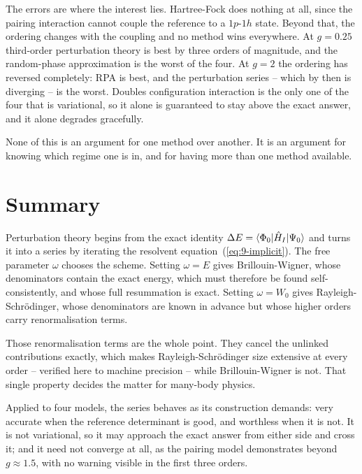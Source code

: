 The errors are where the interest lies.  Hartree-Fock does nothing at all,
since the pairing interaction cannot couple the reference to a $1p$-$1h$
state.  Beyond that, the ordering changes with the coupling and no method
wins everywhere.  At $g=0.25$ third-order perturbation theory is best by
three orders of magnitude, and the random-phase approximation is the worst of
the four.  At $g=2$ the ordering has reversed completely: RPA is best, and
the perturbation series -- which by then is diverging -- is the worst.
Doubles configuration interaction is the only one of the four that is
variational, so it alone is guaranteed to stay above the exact answer, and it
alone degrades gracefully.

None of this is an argument for one method over another.  It is an argument
for knowing which regime one is in, and for having more than one method
available.

\section{Summary}
\label{sec:ch9summary}

Perturbation theory begins from the exact identity
$\Delta E=\langle \Phi_0 | \hat{H}_I | \Psi_0 \rangle$ and turns it into a series by
iterating the resolvent equation~(\ref{eq:9-implicit}).  The free parameter
$\omega$ chooses the scheme.  Setting $\omega=E$ gives Brillouin-Wigner,
whose denominators contain the exact energy, which must therefore be found
self-consistently, and whose full resummation is exact.  Setting $\omega=W_0$
gives Rayleigh-Schr\"odinger, whose denominators are known in advance but
whose higher orders carry renormalisation terms.

Those renormalisation terms are the whole point.  They cancel the unlinked
contributions exactly, which makes Rayleigh-Schr\"odinger size extensive at
every order -- verified here to machine precision -- while Brillouin-Wigner
is not.  That single property decides the matter for many-body physics.

Applied to four models, the series behaves as its construction demands: very
accurate when the reference determinant is good, and worthless when it is
not.  It is not variational, so it may approach the exact answer from either
side and cross it; and it need not converge at all, as the pairing model
demonstrates beyond $g\approx1.5$, with no warning visible in the first three
orders.

